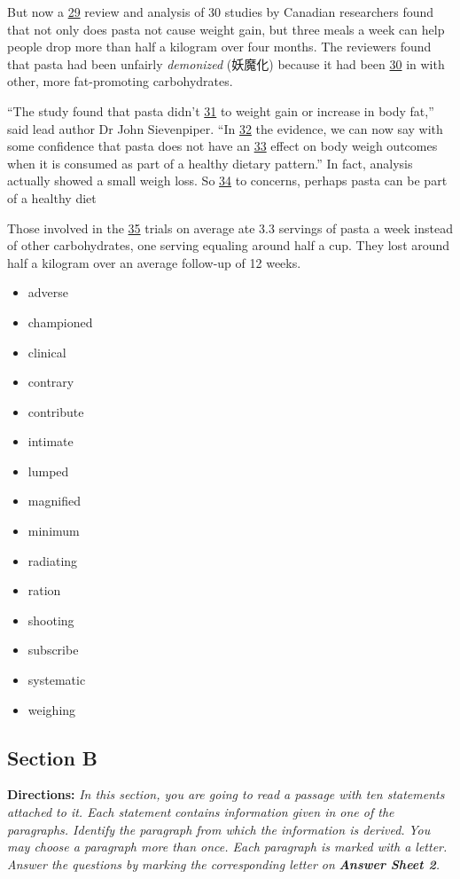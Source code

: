 \documentclass[UTF8,11pt]{ctexart}
\begin{document}
But now a \uline{29} review and analysis of 30 studies by Canadian researchers found that not only does pasta not cause weight gain, but three meals a week can help people drop more than half a kilogram over four months. The reviewers found that pasta had been unfairly\textit{ demonized} (妖魔化) because it had been \uline{30} in with other, more fat-promoting carbohydrates.


“The study found that pasta didn’t \uline{31} to weight gain or increase in body fat,” said lead author Dr John Sievenpiper. “In \uline{32} the evidence, we can now say with some confidence that pasta does not have an \uline{33} effect on body weigh outcomes when it is consumed as part of a healthy dietary pattern.” In fact, analysis actually showed a small weigh loss. So \uline{34} to concerns, perhaps pasta can be part of a healthy diet


Those involved in the \uline{35} trials on average ate 3.3 servings of pasta a week instead of other carbohydrates, one serving equaling around half a cup. They lost around half a kilogram over an average follow-up of 12 weeks.


\begin{itemize}[leftmargin=2em,itemsep=.2em,topsep=.4em]\item[A.] adverse
\item[B.] championed
\item[C.] clinical
\item[D.] contrary
\item[E.] contribute
\item[F.] intimate
\item[G.] lumped
\item[H.] magnified
\item[I.] minimum
\item[J.] radiating
\item[K.] ration
\item[L.] shooting
\item[M.] subscribe
\item[N.] systematic
\item[O.] weighing
\end{itemize}

\subsection*{\textbf{Section B}}


\textbf{Directions:}\textit{ In this section, you are going to read a passage with ten statements attached to it. Each statement} \textit{contains information given in one of the paragraphs. Identify the paragraph from which the information is derived.} \textit{You may choose a paragraph more than once. Each paragraph is marked with a letter. Answer the questions by} \textit{marking the corresponding letter on}\textbf{\textit{ Answer Sheet 2}}\textit{.}
\end{document}
